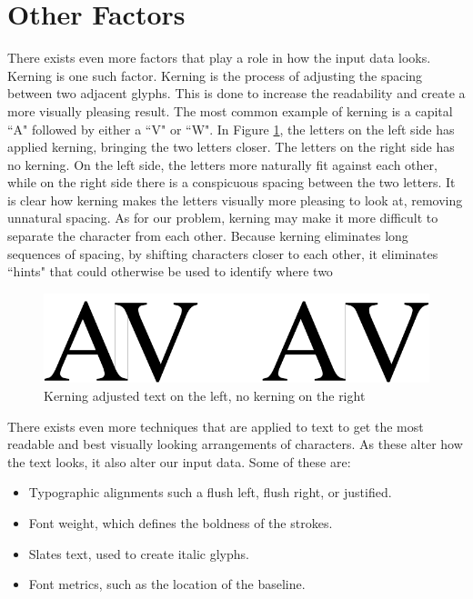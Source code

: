 
\section{Other Factors}
\label{sec:other_factors}
There exists even more factors that play a role in how the input data looks. Kerning is one such factor. Kerning is the process of adjusting the spacing between two adjacent glyphs. This is done to increase the readability and create a more visually pleasing result. The most common example of kerning is a capital ``A" followed by either a ``V" or ``W". In Figure \ref{fig:kerning-comparison}, the letters on the left side has applied kerning, bringing the two letters closer. The letters on the right side has no kerning. On the left side, the letters more naturally fit against each other, while on the right side there is a conspicuous spacing between the two letters. It is clear how kerning makes the letters visually more pleasing to look at, removing unnatural spacing. As for our problem, kerning may make it more difficult to separate the character from each other. Because kerning eliminates long sequences of spacing, by shifting characters closer to each other, it eliminates ``hints" that could otherwise be used to identify where two 

\begin{figure}[ht]
    \centering
    \includegraphics[width=1.0\textwidth]{fig/chapter2/kerning.png}
    \caption{Kerning adjusted text on the left, no kerning on the right}
    \label{fig:kerning-comparison}
\end{figure}

There exists even more techniques that are applied to text to get the most readable and best visually looking arrangements of characters. As these alter how the text looks, it also alter our input data. Some of these are:

\begin{itemize}
    \item Typographic alignments such a flush left, flush right, or justified.
    \item Font weight, which defines the boldness of the strokes.
    \item Slates text, used to create italic glyphs.
    \item Font metrics, such as the location of the baseline.
\end{itemize}

